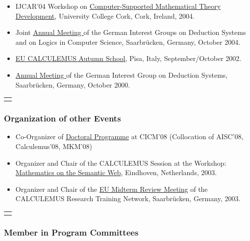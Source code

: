 \documentclass{letter}
\begin{document}
{{\begin{itemize}
  \item IJCAR'04 Workshop on
  \href{http://www.risc.uni-linz.ac.at/conferences/IJCAR-WS7/}{Computer-Supported
  Mathematical Theory Development}, University College Cork, Cork, Ireland,
  2004.
  
  \item Joint {\small \href{http://www.ags.uni-sb.de/\~{
  }omega/workshops/Deduktionstreffen04/}{Annual Meeting }}of the German
  Interest Groups on Deduction Systems and on Logics in Computer Science,
  {\small Saarbr\"ucken, Germany, October 2004.}
  
  \item {\small \href{http://www.eurice.de/calculemus/autumn-school/}{EU
  CALCULEMUS Autumn School}, Pisa, Italy, September/October 2002.}
  
  \item {\small \href{../ded00/}{Annual Meeting }of the German Interest Group
  on Deduction Systems, Saarbr\"ucken, Germany, October 2000.}
\end{itemize}
{\noindent}\begin{tabular}{l}
  \hline
  \quad
\end{tabular}

\subsubsection*{Organization of other Events}

\begin{itemize}
  \item Co-Organizer of
  \href{http://events.cs.bham.ac.uk/cicm08/doctoral/}{Doctoral Programme} at
  CICM'08 (Collocation of AISC'08, Calculemus'08, MKM'08)
  
  \item Organizer and Chair of the CALCULEMUS Session at the Workshop:
  {\color{black} {\small \href{http://www.win.tue.nl/dw/monet}{Mathematics on
  the Semantic Web}}}{\small , Eindhoven, Netherlands, 2003.}
  
  \item Organizer and Chair of the {\small
  \href{file:///home/chris/www/events/mtr-meeting/mtr-meeting.html}{EU Midterm
  Review Meeting} of the CALCULEMUS Research Training Network, Saarbr\"ucken,
  Germany, 2003.}
\end{itemize}
{\noindent}\begin{tabular}{l}
  \hline
  \quad
\end{tabular}

\subsubsection*{Member in Program Committees}

}}
\end{document}
